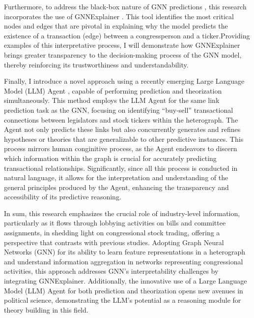 \documentclass[15pt,letterpaper]{article}
\begin{document}
Furthermore, to address the black-box nature of GNN predictions \citep{bb1, bb2, bb3}, this research incorporates the use of GNNExplainer \citep{gex}. This tool identifies the most critical nodes and edges that are pivotal in explaining why the model predicts the existence of a transaction (edge) between a congressperson and a ticker.Providing examples of this interpretative process, I will demonstrate how GNNExplainer brings greater transparency to the decision-making process of the GNN model, thereby reinforcing its trustworthiness and understandability. 

Finally, I introduce a novel approach using a recently emerging Large Language Model (LLM) Agent \citep{shinn2023reflexion, wang2023voyager, park2022social}, capable of performing prediction and theorization simultaneously. This method employs the LLM Agent for the same link prediction task as the GNN, focusing on identifying “buy-sell” transactional connections between legislators and stock tickers within the heterograph. The Agent not only predicts these links but also concurrently generates and refines hypotheses or theories that are generalizable to other predictive instances. This process mirrors human conginitive process, as the Agent endeavors to discern which information within the graph is crucial for accurately predicting transactional relationships. Significantly, since all this process is conducted in natural language, it allows for the interpretation and understanding of the general principles produced by the Agent, enhancing the transparency and accessibility of its predictive reasoning.

In sum, this research emphasizes the crucial role of industry-level information, particularly as it flows through lobbying activities on bills and committee assignments, in shedding light on congressional stock trading, offering a perspective that contrasts with previous studies. Adopting Graph Neural Networks (GNN) for its ability to learn feature representations in a heterograph and understand information aggregation in networks representing congressional activities, this approach addresses GNN's interpretability challenges by integrating GNNExplainer. Additionally, the innovative use of a Large Language Model (LLM) Agent for both prediction and theorization opens new avenues in political science, demonstrating the LLM's potential as a reasoning module for theory building in this field. 





\end{document}
